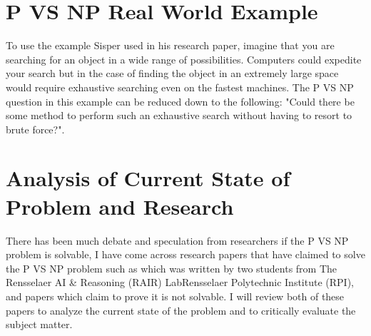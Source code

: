 \documentclass{report}
\begin{document}
\section{P VS NP Real World Example}
To use the example Sisper used in his research paper\cite{HistoryOfPVsNP}, imagine that you are searching for an object in a wide range of possibilities.  Computers could expedite your search but in the case of finding the object in an extremely large space would require exhaustive searching even on the fastest machines.  The P VS NP question in this example can be reduced down to the following: "Could there be some method to perform such an exhaustive search without having to resort to brute force?".
\section{Analysis of Current State of Problem and Research}
There has been much debate and speculation from researchers if the P VS NP problem is solvable, I have come across research papers that have claimed to solve the P VS NP problem such as\cite{PVsNPSolved} which was written by two students from The Rensselaer AI \& Reasoning (RAIR) LabRensselaer Polytechnic Institute (RPI), and papers which claim to prove it is not solvable\cite{P!=NP}. I will review both of these papers to analyze the current state of the problem and to critically evaluate the subject matter.
\end{document}
